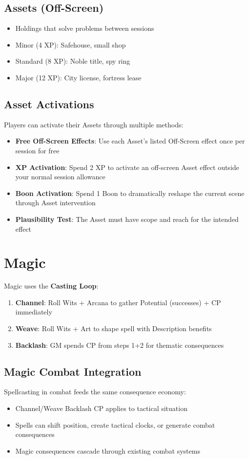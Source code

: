 \documentclass[11pt]{article}
\begin{document}
\subsection{Assets (Off-Screen)}
\begin{itemize}
    \item Holdings that solve problems between sessions
    \item Minor (4 XP): Safehouse, small shop
    \item Standard (8 XP): Noble title, spy ring
    \item Major (12 XP): City license, fortress lease
\end{itemize}

\subsection{Asset Activations}
Players can activate their Assets through multiple methods:
\begin{itemize}
    \item \textbf{Free Off-Screen Effects}: Use each Asset's listed Off-Screen effect once per session for free
    \item \textbf{XP Activation}: Spend 2 XP to activate an off-screen Asset effect outside your normal session allowance
    \item \textbf{Boon Activation}: Spend 1 Boon to dramatically reshape the current scene through Asset intervention
    \item \textbf{Plausibility Test}: The Asset must have scope and reach for the intended effect
\end{itemize}

\section{Magic}

Magic uses the \textbf{Casting Loop}:

\begin{enumerate}
    \item \textbf{Channel}: Roll Wits + Arcana to gather Potential (successes) + CP immediately
    \item \textbf{Weave}: Roll Wits + Art to shape spell with Description benefits
    \item \textbf{Backlash}: GM spends CP from steps 1+2 for thematic consequences
\end{enumerate}

\subsection{Magic Combat Integration}
Spellcasting in combat feeds the same consequence economy:
\begin{itemize}
    \item Channel/Weave Backlash CP applies to tactical situation
    \item Spells can shift position, create tactical clocks, or generate combat consequences
    \item Magic consequences cascade through existing combat systems
\end{itemize}
\end{document}
